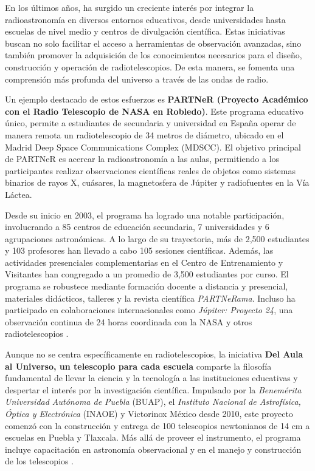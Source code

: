 En los últimos años, ha surgido un creciente interés por integrar la
radioastronomía en diversos entornos educativos, desde universidades hasta
escuelas de nivel medio y centros de divulgación científica.
Estas iniciativas buscan no solo facilitar el acceso a herramientas de
observación avanzadas, sino también promover la adquisición de los
conocimientos necesarios para el diseño, construcción y operación de
radiotelescopios.
De esta manera, se fomenta una comprensión más profunda del universo a través
de las ondas de radio.

Un ejemplo destacado de estos esfuerzos es \textbf{PARTNeR (Proyecto Académico
con el Radio Telescopio de NASA en Robledo)}.
Este programa educativo único,  permite a estudiantes de secundaria y universidad
en España operar de manera remota un radiotelescopio de 34 metros de diámetro,
ubicado en el Madrid Deep Space Communications Complex (MDSCC).
El objetivo principal de PARTNeR es acercar la radioastronomía a las aulas,
permitiendo a los participantes realizar observaciones científicas reales de
objetos como sistemas binarios de rayos X, cuásares, la magnetosfera de Júpiter
y radiofuentes en la Vía Láctea.

Desde su inicio en 2003, el programa ha logrado una notable participación,
involucrando a 85 centros de educación secundaria, 7 universidades y 6
agrupaciones astronómicas.
A lo largo de su trayectoria, más de 2,500 estudiantes y 103 profesores han
llevado a cabo 105 sesiones científicas.
Además, las actividades presenciales complementarias en el Centro de
Entrenamiento y Visitantes han congregado a un promedio de 3,500 estudiantes
por curso.
El programa se robustece mediante formación docente a distancia y presencial,
materiales didácticos, talleres y la revista científica \textit{PARTNeRama}.
Incluso ha participado en colaboraciones internacionales como \textit{Júpiter:
Proyecto 24}, una observación continua de 24 horas coordinada con la NASA
y otros radiotelescopios \cite{Vaquerizo2010}.

Aunque no se centra específicamente en radiotelescopios, la iniciativa
\textbf{Del Aula al Universo, un telescopio para cada escuela} comparte la
filosofía fundamental de llevar la ciencia y la tecnología a las instituciones
educativas y despertar el interés por la investigación científica.
Impulsado por la \emph{Benemérita Universidad Autónoma de Puebla} (BUAP), el
\emph{Instituto Nacional de Astrofísica, Óptica y Electrónica} (INAOE)
y Victorinox México desde 2010, este proyecto comenzó con la construcción
y entrega de 100 telescopios newtonianos de 14 cm a escuelas en Puebla
y Tlaxcala.
Más allá de proveer el instrumento, el programa incluye capacitación en
astronomía observacional y en el manejo y construcción de los telescopios
\cite{AIDCT2011}.


